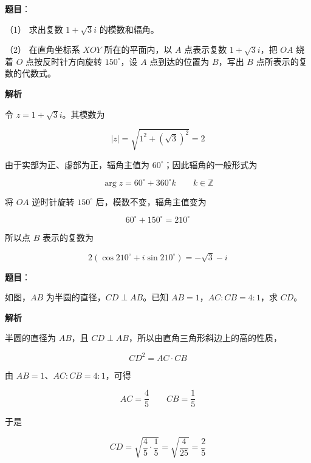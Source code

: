 \begin{answer}

\textbf{题目}：

（1） 求出复数 $1+\sqrt3i$ 的模数和辐角。

（2） 在直角坐标系 $XOY$ 所在的平面内，以 $A$ 点表示复数 $1+\sqrt3i$，把 $OA$ 绕着 $O$ 点按反时针方向旋转 $150^\circ$，设 $A$ 点到达的位置为 $B$，写出 $B$ 点所表示的复数的代数式。

\textbf{解析}


令 $z=1+\sqrt3i$。其模数为

\nopagebreak[4]
\[
|z|=\sqrt{1^2+(\sqrt3)^2}=2
\]

由于实部为正、虚部为正，辐角主值为 $60^\circ$；因此辐角的一般形式为

\nopagebreak[4]
\[
\arg z=60^\circ+360^\circ k\qquad k\in\mathbb Z
\]
\nopagebreak[4]
\begin{center}\end{center}
\nopagebreak[4]

将 $OA$ 逆时针旋转 $150^\circ$ 后，模数不变，辐角主值变为

\nopagebreak[4]
\[
60^\circ+150^\circ=210^\circ
\]

所以点 $B$ 表示的复数为

\nopagebreak[4]
\[
2(\cos210^\circ+i\sin210^\circ)=-\sqrt3-i
\]



\end{answer}
\begin{answer}

\textbf{题目}：

如图，$AB$ 为半圆的直径，$CD\perp AB$。已知 $AB=1$，$AC:CB=4:1$，求 $CD$。
\nopagebreak[4]
\begin{center}\end{center}
\nopagebreak[4]
\textbf{解析}

半圆的直径为 $AB$，且 $CD\perp AB$，所以由直角三角形斜边上的高的性质，

\nopagebreak[4]
\[
CD^2=AC\cdot CB
\]

由 $AB=1$、$AC:CB=4:1$，可得

\nopagebreak[4]
\[
AC=\frac45\qquad CB=\frac15
\]

于是

\nopagebreak[4]
\[
CD=\sqrt{\frac45\cdot\frac15}
=\sqrt{\frac4{25}}
=\frac25
\]


\end{answer}
